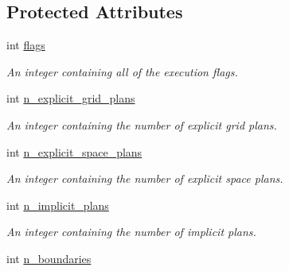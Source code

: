 \subsection*{Protected Attributes}
\begin{DoxyCompactItemize}
\item 
\hypertarget{classelement_1_1element_a018a50e33f8c282b5672b7b5c0ba8f53}{int \hyperlink{classelement_1_1element_a018a50e33f8c282b5672b7b5c0ba8f53}{flags}}\label{classelement_1_1element_a018a50e33f8c282b5672b7b5c0ba8f53}

\begin{DoxyCompactList}\small\item\em An integer containing all of the execution flags. \end{DoxyCompactList}\item 
\hypertarget{classelement_1_1element_a7c21ff2cc068eb5c612c467f43d2dad9}{int \hyperlink{classelement_1_1element_a7c21ff2cc068eb5c612c467f43d2dad9}{n\-\_\-explicit\-\_\-grid\-\_\-plans}}\label{classelement_1_1element_a7c21ff2cc068eb5c612c467f43d2dad9}

\begin{DoxyCompactList}\small\item\em An integer containing the number of explicit grid plans. \end{DoxyCompactList}\item 
\hypertarget{classelement_1_1element_a096ac4c9d76df9c75b1e1976f732c395}{int \hyperlink{classelement_1_1element_a096ac4c9d76df9c75b1e1976f732c395}{n\-\_\-explicit\-\_\-space\-\_\-plans}}\label{classelement_1_1element_a096ac4c9d76df9c75b1e1976f732c395}

\begin{DoxyCompactList}\small\item\em An integer containing the number of explicit space plans. \end{DoxyCompactList}\item 
\hypertarget{classelement_1_1element_a60ebcd4f5a015c7e1fed56e1ec4c770d}{int \hyperlink{classelement_1_1element_a60ebcd4f5a015c7e1fed56e1ec4c770d}{n\-\_\-implicit\-\_\-plans}}\label{classelement_1_1element_a60ebcd4f5a015c7e1fed56e1ec4c770d}

\begin{DoxyCompactList}\small\item\em An integer containing the number of implicit plans. \end{DoxyCompactList}\item 
\hypertarget{classelement_1_1element_ab4595ec50129256c83e6cc1e37fb2f46}{int \hyperlink{classelement_1_1element_ab4595ec50129256c83e6cc1e37fb2f46}{n\-\_\-boundaries}}\label{classelement_1_1element_ab4595ec50129256c83e6cc1e37fb2f46}


\end{DoxyCompactItemize}
